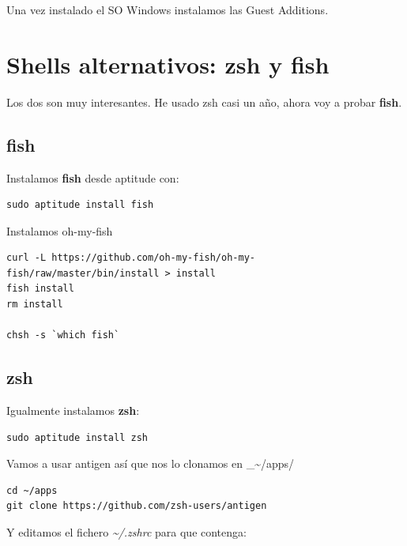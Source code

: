 \documentclass[12pt,spanish,]{article}
\begin{document}
Una vez instalado el SO Windows instalamos las Guest Additions.

\section{Shells alternativos: zsh y
fish}\label{shells-alternativos-zsh-y-fish}

Los dos son muy interesantes. He usado zsh casi un año, ahora voy a
probar \textbf{fish}.

\subsection{fish}\label{fish}

Instalamos \textbf{fish} desde aptitude con:

\begin{verbatim}
sudo aptitude install fish
\end{verbatim}

Instalamos oh-my-fish

\begin{verbatim}
curl -L https://github.com/oh-my-fish/oh-my-fish/raw/master/bin/install > install
fish install
rm install

chsh -s `which fish`
\end{verbatim}

\subsection{zsh}\label{zsh}

Igualmente instalamos \textbf{zsh}:

\begin{verbatim}
sudo aptitude install zsh
\end{verbatim}

Vamos a usar antigen así que nos lo clonamos en
\_\textasciitilde{}/apps/

\begin{verbatim}
cd ~/apps
git clone https://github.com/zsh-users/antigen
\end{verbatim}

Y editamos el fichero \emph{\textasciitilde{}/.zshrc} para que contenga:
\end{document}
